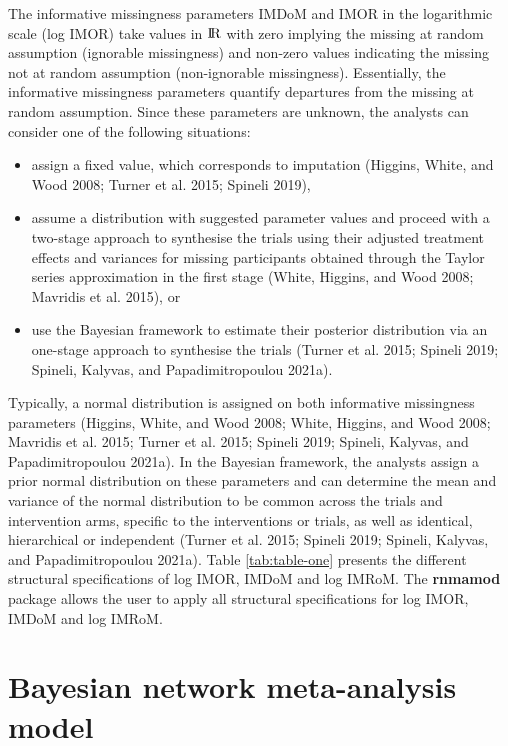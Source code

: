 The informative missingness parameters IMDoM and IMOR in the logarithmic scale
(log IMOR) take values in \({\rm I\!R}\) with zero implying the missing at random
assumption (ignorable missingness) and non-zero values indicating the missing not
at random assumption (non-ignorable missingness). Essentially, the informative
missingness parameters quantify departures from the missing at random assumption.
Since these parameters are unknown, the analysts can consider one of the following
situations:

\begin{itemize}
\tightlist
\item
  assign a fixed value, which corresponds to imputation (Higgins, White, and Wood 2008; Turner et al. 2015; Spineli 2019),
\item
  assume a distribution with suggested parameter values and proceed with a two-stage
  approach to synthesise the trials using their adjusted treatment effects and variances
  for missing participants obtained through the Taylor series approximation in the
  first stage (White, Higgins, and Wood 2008; Mavridis et al. 2015), or
\item
  use the Bayesian framework to estimate their posterior distribution via an one-stage
  approach to synthesise the trials (Turner et al. 2015; Spineli 2019; Spineli, Kalyvas, and Papadimitropoulou 2021a).
\end{itemize}

Typically, a normal distribution is assigned on both informative missingness parameters
(Higgins, White, and Wood 2008; White, Higgins, and Wood 2008; Mavridis et al. 2015; Turner et al. 2015; Spineli 2019; Spineli, Kalyvas, and Papadimitropoulou 2021a).
In the Bayesian framework, the analysts assign a prior normal distribution on these
parameters and can determine the mean and variance of the normal distribution to
be common across the trials and intervention arms, specific to the interventions or
trials, as well as identical, hierarchical or independent (Turner et al. 2015; Spineli 2019; Spineli, Kalyvas, and Papadimitropoulou 2021a). Table
\ref{tab:table-one} presents the different structural specifications of
log IMOR, IMDoM and log IMRoM. The \textbf{rnmamod} package allows the user to apply
all structural specifications for log IMOR, IMDoM and log IMRoM.

\hypertarget{bayesian-network-meta-analysis-model}{%
\section{Bayesian network meta-analysis model}\label{bayesian-network-meta-analysis-model}}

